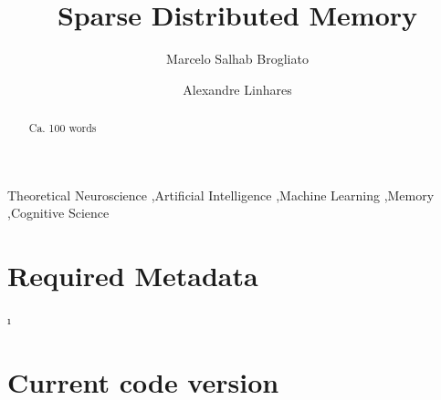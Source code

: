 \documentclass[preprint,12pt, a4paper]{elsarticle}
\begin{document}
\begin{frontmatter}



\title{Sparse Distributed Memory}


\author{Marcelo Salhab Brogliato}
\author{Alexandre Linhares}

\address{Getulio Vargas Foundation}

\begin{abstract}
Ca. 100 words

\end{abstract}

\begin{keyword}
Theoretical Neuroscience \sep Artificial Intelligence \sep Machine Learning \sep Memory \sep Cognitive Science



\end{keyword}

\end{frontmatter}

\section*{Required Metadata}
\label{}
ı
\section*{Current code version}
\label{}
\end{document}
